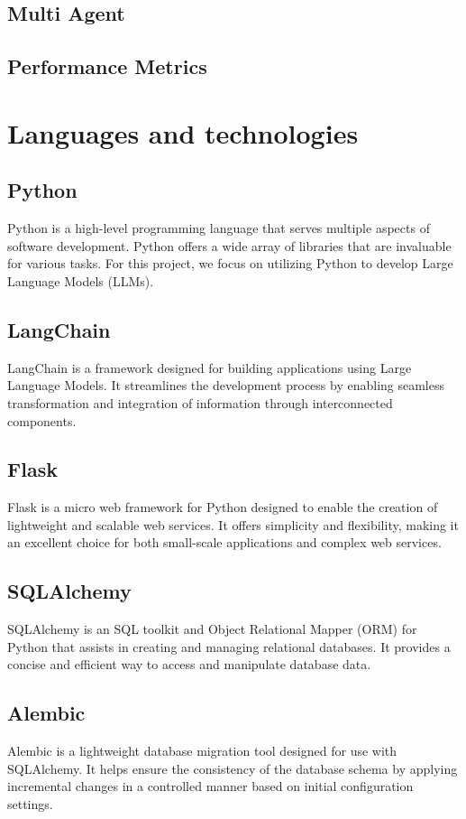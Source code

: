     \subsection{Multi Agent}
    \subsection{Performance Metrics}
\section{Languages and technologies}
    \subsection{Python}
    Python is a high-level programming language that serves multiple aspects of software development. Python offers a wide array of libraries that are invaluable for various tasks. For this project, we focus on utilizing Python to develop Large Language Models (LLMs).
    \subsection{LangChain}
    LangChain is a framework designed for building applications using Large Language Models. It streamlines the development process by enabling seamless transformation and integration of information through interconnected components.
    \subsection{Flask}
    Flask is a micro web framework for Python designed to enable the creation of lightweight and scalable web services. It offers simplicity and flexibility, making it an excellent choice for both small-scale applications and complex web services.
    \subsection{SQLAlchemy}
    SQLAlchemy is an SQL toolkit and Object Relational Mapper (ORM) for Python that assists in creating and managing relational databases. It provides a concise and efficient way to access and manipulate database data.
    \subsection{Alembic}
    Alembic is a lightweight database migration tool designed for use with SQLAlchemy. It helps ensure the consistency of the database schema by applying incremental changes in a controlled manner based on initial configuration settings.
